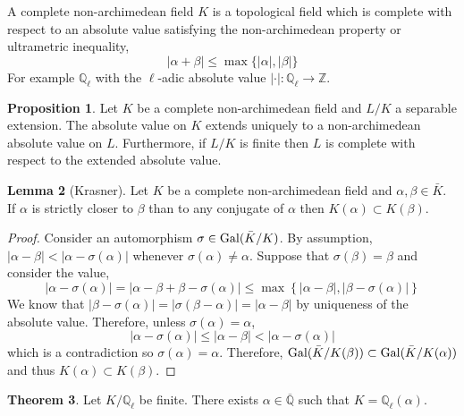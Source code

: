 \documentclass[12pt]{article}
\newcommand{\Z}{\mathbb{Z}}
\newcommand{\Q}{\mathbb{Q}}
\newcommand{\Gal}[1]{\mathrm{Gal} \small(#1 \small)}
\theoremstyle{remark}
\theoremstyle{definition}
\newtheorem{theorem}{Theorem}[section]
\newtheorem{lemma}[theorem]{Lemma}
\newtheorem{proposition}[theorem]{Proposition}
\newenvironment{definition}[1][Definition:]{\begin{trivlist}
\item[\hskip \labelsep {\bfseries #1}]}{\end{trivlist}}
\begin{document}
\begin{definition}
A complete non-archimedean field $K$ is a topological field which is complete with respect to an absolute value satisfying the non-archimedean property or ultrametric inequality,
\[ |\alpha + \beta| \le \max\{|\alpha|, |\beta|\} \]
For example $\Q_{\ell}$ with the $\ell$-adic absolute value $| \cdot | : \Q_{\ell} \to \Z$. 
\end{definition}

\begin{proposition}
Let $K$ be a complete non-archimedean field and $L / K$ a separable extension. The absolute value on $K$ extends uniquely to a non-archimedean absolute value on $L$. Furthermore, if $L / K$ is finite then $L$ is complete with respect to the extended absolute value. 
\end{proposition}

\begin{lemma}[Krasner]
Let $K$ be a complete non-archimedean field and $\alpha, \beta \in \bar{K}$. If $\alpha$ is strictly closer to $\beta$ than to any conjugate of $\alpha$ then $K(\alpha) \subset K(\beta)$.
\end{lemma}

\begin{proof}
Consider an automorphism $\sigma \in \Gal{\bar{K} / K}$. By assumption, $|\alpha - \beta | < |\alpha - \sigma(\alpha)|$ whenever $\sigma(\alpha) \neq \alpha$. Suppose that $\sigma(\beta) = \beta$ and consider the value,
\[ |\alpha - \sigma(\alpha)| = |\alpha - \beta + \beta - \sigma(\alpha) | \le \max \left\{ | \alpha - \beta |, | \beta - \sigma(\alpha)| \right\} \]
We know that $|\beta - \sigma(\alpha)| = |\sigma(\beta - \alpha)| = |\alpha - \beta|$ by uniqueness of the absolute value. Therefore, unless $\sigma(\alpha) = \alpha$,
\[ |\alpha - \sigma(\alpha)| \le |\alpha - \beta| < |\alpha - \sigma(\alpha)| \] 
which is a contradiction so $\sigma(\alpha) = \alpha$. Therefore, $\Gal{\bar{K} / K(\beta)} \subset \Gal{\bar{K} / K(\alpha)}$ and thus $K(\alpha) \subset K(\beta)$. 
\end{proof}

\begin{theorem} \label{thm:algebraic_extensions_adics}
Let $K / \Q_{\ell}$ be finite. There exists $\alpha \in \overline{\Q}$ such that $K = \Q_{\ell}(\alpha)$. 
\end{theorem}
\end{document}
